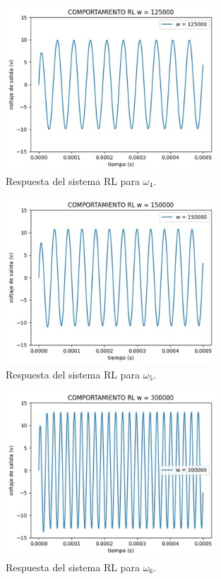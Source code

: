 \documentclass{article}
\begin{document}
\begin{figure}[H]
    \centering
    \includegraphics[width=0.7\textwidth]{OMw4RL.jpg}
    \caption{Respuesta del sistema RL para $\omega_4$.}
\end{figure}

\begin{figure}[H]
    \centering
    \includegraphics[width=0.7\textwidth]{OMw5RL.jpg}
    \caption{Respuesta del sistema RL para $\omega_5$.}
\end{figure}

\begin{figure}[H]
    \centering
    \includegraphics[width=0.7\textwidth]{OMw6RL.jpg}
    \caption{Respuesta del sistema RL para $\omega_6$.}
\end{figure}
\end{document}
